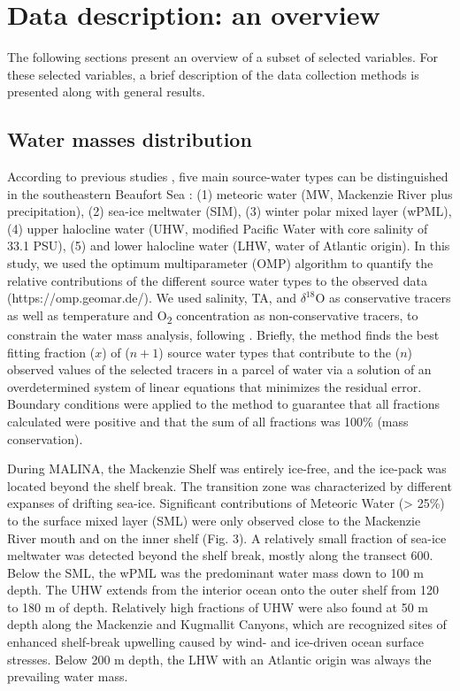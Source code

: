 \documentclass[essd, manuscript]{copernicus}
\begin{document}
\section{Data description: an overview}

The following sections present an overview of a subset of selected variables. For these selected variables, a brief description of the data collection methods is presented along with general results. 

\subsection{Water masses distribution}

According to previous studies \citep{Carmack1989, Macdonald1989}, five main source-water types can be distinguished in the southeastern Beaufort Sea : (1) meteoric water (MW, Mackenzie River plus precipitation), (2) sea-ice meltwater (SIM), (3) winter polar mixed layer (wPML), (4) upper halocline water (UHW, modified Pacific Water with core salinity of 33.1 PSU), (5) and lower halocline water (LHW, water of Atlantic origin). In this study, we used the optimum multiparameter (OMP) algorithm to quantify the relative contributions of the different source water types to the observed data (https://omp.geomar.de/). We used salinity, TA, and $\delta^{18}$O as conservative tracers as well as temperature and O\textsubscript{2} concentration as non-conservative tracers, to constrain the water mass analysis, following \citet{Lansard2012}. Briefly, the method finds the best fitting fraction ($x$) of ($n+1$) source water types that contribute to the ($n$) observed values of the selected tracers in a parcel of water via a solution of an overdetermined system of linear equations that minimizes the residual error. Boundary conditions were applied to the method to guarantee that all fractions calculated were positive and that the sum of all fractions was 100\% (mass conservation).

During MALINA, the Mackenzie Shelf was entirely ice-free, and the ice-pack was located beyond the shelf break. The transition zone was characterized by different expanses of drifting sea-ice. Significant contributions of Meteoric Water (> 25\%) to the surface mixed layer (SML) were only observed close to the Mackenzie River mouth and on the inner shelf (Fig. 3). A relatively small fraction of sea-ice meltwater was detected beyond the shelf break, mostly along the transect 600. Below the SML, the wPML was the predominant water mass down to 100  m depth. The UHW extends from the interior ocean onto the outer shelf from 120 to 180 m of depth. Relatively high fractions of UHW were also found at 50 m depth along the Mackenzie and Kugmallit Canyons, which are recognized sites of enhanced shelf-break upwelling caused by wind- and ice-driven ocean surface stresses. Below 200 m depth, the LHW with an Atlantic origin was always the prevailing water mass.
\end{document}

